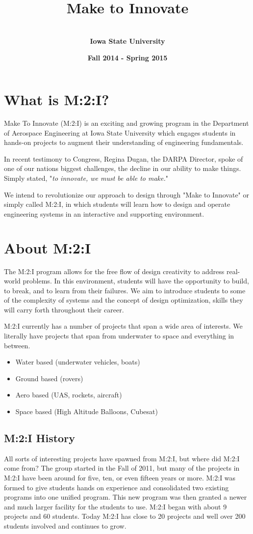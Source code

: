 \documentclass[10pt,foldmark,notumble]{leaflet}
\title{\bf \ \\ Make to Innovate}
\author{%
\Large \bf \ \\ Iowa State University
}
\date{\bf Fall 2014 - Spring 2015}
\begin{document}
\maketitle
\section{What is M:2:I?} Make To Innovate (M:2:I) is an exciting and growing program in the Department of Aerospace Engineering at Iowa State University which engages students in hands-on projects to augment their understanding of engineering fundamentals.

In recent testimony to Congress, Regina Dugan, the DARPA Director, spoke of one of our nations biggest challenges, the decline in our ability to make things.  Simply stated, "\emph{to innovate, we must be able to make.}"

We intend to revolutionize our approach to design through "Make to Innovate" or simply called M:2:I, in which students will learn how to design and operate engineering systems in an interactive and supporting environment.

\section{About M:2:I}
The M:2:I program allows for the free flow of design creativity to address real-world problems. In this environment, students will have the opportunity to build, to break, and to learn from their failures. We aim to introduce students to some of the complexity of systems and the concept of design optimization, skills they will carry forth throughout their career.

M:2:I currently has a number of projects that span a wide area of interests.  We literally have projects that span from underwater to space and everything in between.  
\begin{itemize}
\item Water based (underwater vehicles, boats)
\item Ground based (rovers)
\item Aero based (UAS, rockets, aircraft)
\item Space based (High Altitude Balloons, Cubesat)
\end{itemize}
\subsection{M:2:I History}
All sorts of interesting projects have spawned from M:2:I, but where did M:2:I come from? The group started in the Fall of 2011, but many of the projects in M:2:I have been around for five, ten, or even fifteen years or more. M:2:I was formed to give students hands on experience and consolidated two existing programs into one unified program.  This new program was then granted a newer and much larger facility for the students to use.  M:2:I began with about 9 projects and 60 students.  Today M:2:I has close to 20 projects and well over 200 students involved and continues to grow.
\end{document}
